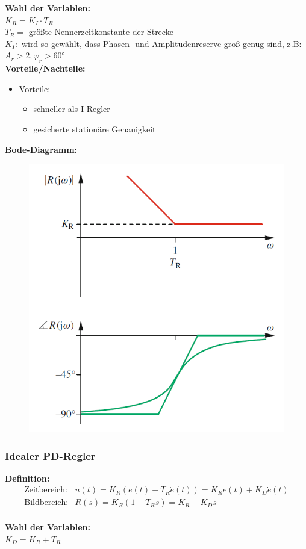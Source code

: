 \documentclass[10pt,a4paper]{article}
\begin{document}
\textbf{Wahl der Variablen:} \\
$K_R = K_I ⋅ T_R$  \\
$T_R =$ größte Nennerzeitkonstante der Strecke \\
$K_I:$ wird so gewählt, dass Phasen- und Amplitudenreserve groß genug sind, z.B: $A_r > 2, \varphi_r > 60°$ \\

\textbf{Vorteile/Nachteile:}
\begin{itemize}
	\item Vorteile:
	\begin{itemize}
		\item schneller als I-Regler
		\item gesicherte stationäre Genauigkeit
	\end{itemize}
\end{itemize}

\textbf{Bode-Diagramm:}
\begin{figure}[H]
	\includegraphics[width = 0.4\columnwidth]{imgs/pi-regler.png}
\end{figure}


\subsubsection{Idealer PD-Regler}
\textbf{Definition:}
$$
	\begin{array}{ll}
	\text{Zeitbereich:} & u(t) = K_R (e(t) + T_R \dot e(t)) = K_R e(t) + K_D \dot e(t) \\
	\text{Bildbereich:} & R(s) = K_R(1 + T_R s) = K_R + K_D s
	\end{array}
$$ \\

\textbf{Wahl der Variablen:} \\
$K_D = K_R + T_R $  \\
\end{document}
